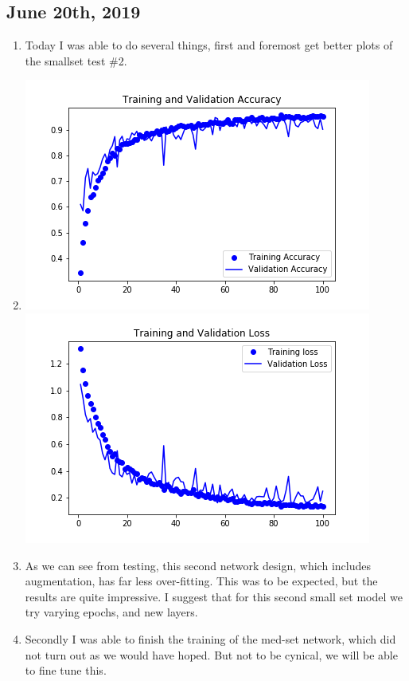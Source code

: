 \documentclass[12pt]{article} %
\begin{document}
\subsection{June 20th, 2019}
\noindent\makebox[\linewidth]{\rule{15cm}{0.4pt}}
\begin{enumerate}[label = (\roman*)]
\item Today I was able to do several things, first and foremost get better plots of the smallset test \#2.
\item\includegraphics{train-vs-val-acc-small2}\newline \includegraphics{train-vs-val-loss-small2}
\item As we can see from testing, this second network design, which includes augmentation, has far less over-fitting. This was to be expected, but the results are quite impressive. I suggest that for this second small set model we try varying epochs, and new layers.
\item Secondly I was able to finish the training of the med-set network, which did not turn out as we would have hoped. But not to be cynical, we will be able to fine tune this.

\end{enumerate}
\end{document}
